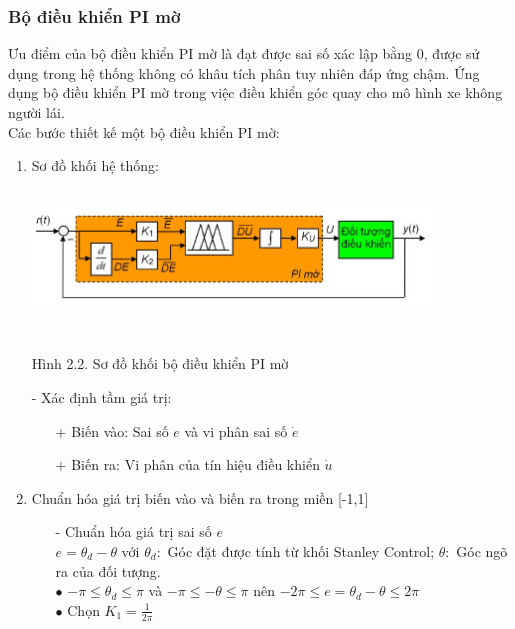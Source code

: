 \documentclass[a4paper, 12pt]{article}
\begin{document}
\subsubsection{Bộ điều khiển PI mờ}
\hspace{0.5cm}
Ưu điểm của bộ điều khiển PI mờ là đạt được sai số xác lập bằng 0, được sử dụng trong hệ thống không có khâu tích phân tuy nhiên đáp ứng chậm. Ứng dụng bộ điều khiển PI mờ trong việc điều khiển góc quay cho mô hình xe không người lái.\\\indent
Các bước thiết kế một bộ điều khiển PI mờ:\\
\begin{enumerate}
	\item Sơ đồ khối hệ thống:\\
	\includegraphics[width=400px,height=160px]{images/BDKPI}\\
	\begin{center}
		Hình 2.2. Sơ đồ khối bộ điều khiển PI mờ\\
	\end{center}
	\newpage
	- Xác định tầm giá trị:
	\begin{enumerate}
		\item[+] Biến vào: Sai số $e$ và vi phân sai số $\dot{e}$
		\item[+] Biến ra: Vi phân của tín hiệu điều khiển $\dot{u}$
	\end{enumerate}
	\item Chuẩn hóa giá trị biến vào và biến ra trong miền [-1,1]\\
	\begin{enumerate}
		\item[-] Chuẩn hóa giá trị sai số $e$\\\indent
		$ e = \theta_{d} - \theta $ với $ \theta_{d}:$ Góc đặt được tính từ khối Stanley Control; $\theta:$ Góc ngõ ra của đối tượng.\\\indent
		$\bullet$ $-\pi \le \theta_{d} \le \pi$ và $-\pi \le -\theta \le \pi$ nên $-2\pi \le e = \theta_{d} - \theta \le 2\pi$\\\indent
		$\bullet$ Chọn $K_{1} = \frac{1}{2\pi}$

\end{enumerate}
\end{enumerate}
\end{document}
